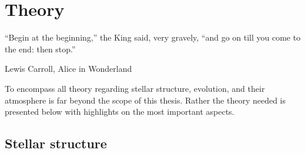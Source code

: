 \chapter{Theory}
\label{cha:theory}

\epigraph{``Begin at the beginning,'' the King said, very gravely, ``and go on till you come to the
          end: then stop.''}{Lewis Carroll, Alice in Wonderland}

To encompass all theory regarding stellar structure, evolution, and their atmosphere is far beyond
the scope of this thesis. Rather the theory needed is presented below with highlights on the most
important aspects.

\section{Stellar structure}

